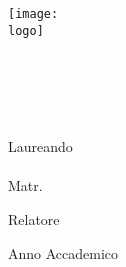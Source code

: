 \thispagestyle{empty}
\begin{center}
    \vspace{8mm}
    {\texttt{[image: \\logo]}}\\
    \vspace{8mm}
    {\large \university} \\
    \vspace{8mm}
    {\large \department} \\
    {\large \degree} \\
    \vspace{8mm}
    {\large \doctype} \\
    \vspace{10mm}
    {\large\bf \doctitle} \\
    \vspace{8mm}
    {\large Laureando \\ {\bf{\thesisauthor}} \\ Matr. \matriculation }\\
    \vspace{14mm}

    Relatore \\
    \bf{\supervisor}

    \vfill
    {\large Anno Accademico \\ \academicyear} \\
\end{center}
\newpage
